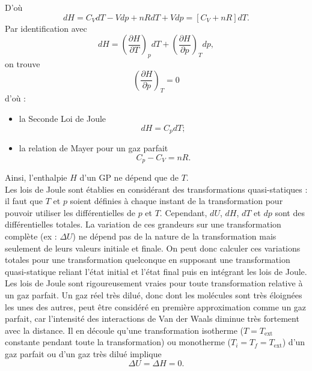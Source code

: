 \documentclass[11pt,a4paper]{report}
\begin{document}
D'où
\begin{equation}
	dH = C_V dT -Vdp + nRdT + Vdp = \left[C_V + nR\right]dT.
\end{equation}
Par identification avec
\begin{equation}
	dH = \left(\frac{\partial H}{\partial T}\right)_p dT + \left(\frac{\partial H}{\partial p}\right)_T dp,
\end{equation}
on trouve
\begin{equation}
	\left(\frac{\partial H}{\partial p}\right)_T = 0
\end{equation}
d'où :

\begin{itemize}
	\item la Seconde Loi de Joule
	\begin{equation}
		dH = C_p dT;
	\end{equation}
	\item la relation de Mayer pour un gaz parfait
	\begin{equation}
		C_p - C_V = nR.
	\end{equation}
\end{itemize}
Ainsi, l'enthalpie $H$ d'un GP ne dépend que de $T$.\\

Les lois de Joule sont établies en considérant des transformations quasi-statiques : il faut que $T$ et $p$ soient définies à chaque instant de la transformation pour pouvoir utiliser les différentielles de $p$ et $T$. Cependant, $dU$, $dH$, $dT$ et $dp$ sont des différentielles totales. La variation de ces grandeurs sur une transformation complète (ex : $\Delta U$) ne dépend pas de la nature de la transformation mais seulement de leurs valeurs initiale et finale. On peut donc calculer ces variations totales pour une transformation quelconque en supposant une transformation quasi-statique reliant l'état initial et l'état final puis en intégrant les lois de Joule.\\

Les lois de Joule sont rigoureusement vraies pour toute transformation relative à un gaz parfait. Un gaz réel très dilué, donc dont les molécules sont très éloignées les unes des autres, peut être considéré en première approximation comme un gaz parfait, car l'intensité des interactions de Van der Waals diminue très fortement avec la distance. Il en découle qu'une transformation isotherme ($T = T_\text{ext}$ constante pendant toute la transformation) ou monotherme ($T_i = T_f = T_\text{ext}$) d'un gaz parfait ou d'un gaz très dilué implique
\begin{equation}
	\Delta U = \Delta H = 0.
\end{equation}
\end{document}
